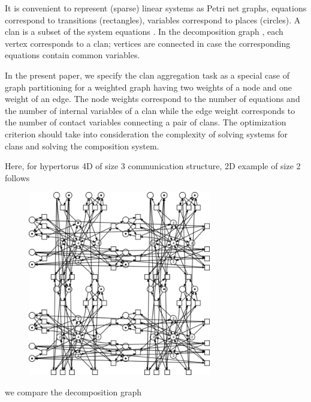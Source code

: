 \documentclass[10pt, a5paper]{article}
\begin{document}
It is convenient to represent (sparse) linear systems as Petri net graphs, equations correspond to transitions (rectangles), variables \linebreak correspond to places (circles). A clan is a subset of the system equations \cite{bib1}. In the decomposition graph \cite{bib1}, each vertex corresponds to a clan; vertices are connected in case the corresponding equations contain common variables.

In the present paper, we specify the clan aggregation task as a special case of graph partitioning \cite{bib7} for a weighted graph having two weights of a node and one weight of an edge. The node weights \linebreak correspond to the number of equations and the number of internal variables of a clan while the edge weight corresponds to the number of contact variables connecting a pair of clans. The optimization criterion should take into consideration the complexity of solving systems for clans and solving the composition system.

Here, for hypertorus 4D of size 3 communication structure, 2D example of size 2 follows

\begin{center}
\begin{figure}[h!]
  \centering
  \includegraphics[width=8cm]{Zaitsev1.png}

  \label{fig1}
\end{figure}
\end{center}

\noindent we compare the decomposition graph
\end{document}
